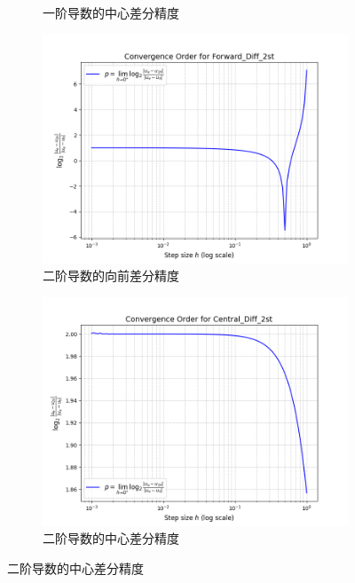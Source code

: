 \documentclass[12pt, a4paper]{article}
\begin{document}
\begin{figure}[htbp]
\begin{subfigure}[b]{0.45\textwidth}
        \caption{一阶导数的中心差分精度}
        \label{fig: COC1}
    \end{subfigure}
    \vspace{0.5cm}
    \centering
    \begin{subfigure}[b]{0.45\textwidth} 
        \centering
        \includegraphics[width=\textwidth]{./pictures/Convergence Order for Forward_Diff_2st.png} 
        \caption{二阶导数的向前差分精度}
        \label{fig: COF2}
    \end{subfigure}
    \hfill
    \begin{subfigure}[b]{0.45\textwidth} 
        \centering
        \includegraphics[width=\textwidth]{./pictures/Convergence Order for Central_Diff_2st.png} 
        \caption{二阶导数的中心差分精度}
        \label{fig: COC2}
    \end{subfigure}
\end{figure}
\end{document}
